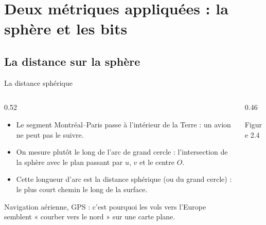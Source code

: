 \section{Deux métriques appliquées : la sphère et les bits}

\subsection{La distance sur la sphère}

\begin{frame}{La distance sphérique}
  \begin{columns}[c]
    \begin{column}{0.52\textwidth}
      \small
      \begin{itemize}
        \item Le segment Montréal--Paris passe à l'intérieur de
          la Terre : un avion ne peut pas le suivre.
        \item On mesure plutôt le long de l'arc de grand cercle :
          l'intersection de la sphère avec le plan passant par $u$, $v$
          et le centre $O$.
        \item Cette longueur d'arc est la distance sphérique (ou
          du grand cercle) : le plus court chemin le long de la
          surface.
      \end{itemize}
      \vspace{2pt}
      \scriptsize Navigation aérienne, GPS : c'est pourquoi les vols vers
      l'Europe semblent « courber vers le nord » sur une carte plane.
    \end{column}
    \begin{column}{0.46\textwidth}
      \begin{center}\scriptsize Figure 2.4\end{center}
    \end{column}
  \end{columns}
\end{frame}

